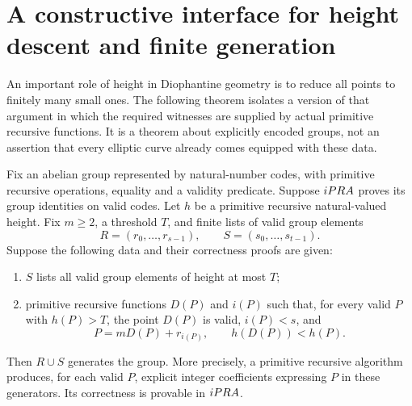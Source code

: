 \section{A constructive interface for height descent and finite generation}
\label{sec:generation}

An important role of height in Diophantine geometry is to reduce all points
to finitely many small ones. The following theorem isolates a version of
that argument in which the required witnesses are supplied by actual
primitive recursive functions. It is a theorem about explicitly encoded
groups, not an assertion that every elliptic curve already comes equipped
with these data.

\begin{theorem}
\label{thm:generation}
Fix an abelian group represented by natural-number codes, with primitive
recursive operations, equality and a validity predicate. Suppose $iPRA$
proves its group identities on valid codes. Let $h$ be a primitive recursive
natural-valued height. Fix $m\ge2$, a threshold $T$, and finite lists of valid group elements
\[
      R=(r_0,\ldots,r_{s-1}),\qquad S=(s_0,\ldots,s_{t-1}).
\]
Suppose the following data and their correctness proofs are given:
\begin{enumerate}
\item $S$ lists all valid group elements of height at most $T$;
\item primitive recursive functions $D(P)$ and $i(P)$ such that, for every
valid $P$ with $h(P)>T$, the point $D(P)$ is valid, $i(P)<s$, and
\[
               P=mD(P)+r_{i(P)},\qquad h(D(P))<h(P).
\]
\end{enumerate}
Then $R\cup S$ generates the group. More precisely, a primitive recursive
algorithm produces, for each valid $P$, explicit integer coefficients
expressing $P$ in these generators. Its correctness is provable in $iPRA$.
\end{theorem}
